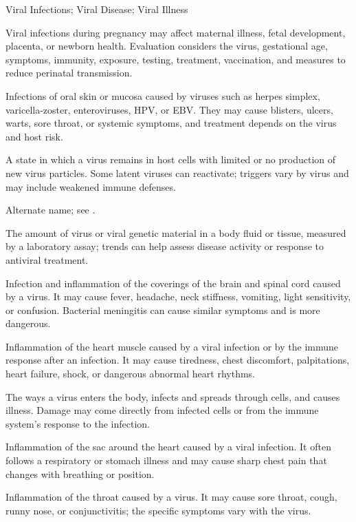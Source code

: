 \synonyms
Viral Infections; Viral Disease; Viral Illness

 Viral infections during pregnancy may affect maternal illness, fetal development, placenta, or newborn health. Evaluation considers the virus, gestational age, symptoms, immunity, exposure, testing, treatment, vaccination, and measures to reduce perinatal transmission.

 Infections of oral skin or mucosa caused by viruses such as herpes simplex, varicella-zoster, enteroviruses, HPV, or EBV. They may cause blisters, ulcers, warts, sore throat, or systemic symptoms, and treatment depends on the virus and host risk.

 A state in which a virus remains in host cells with limited or no production of new virus particles. Some latent viruses can reactivate; triggers vary by virus and may include weakened immune defenses.

 Alternate name; see .

 The amount of virus or viral genetic material in a body fluid or tissue, measured by a laboratory assay; trends can help assess disease activity or response to antiviral treatment.

 Infection and inflammation of the coverings of the brain and spinal cord caused by a virus. It may cause fever, headache, neck stiffness, vomiting, light sensitivity, or confusion. Bacterial meningitis can cause similar symptoms and is more dangerous.

 Inflammation of the heart muscle caused by a viral infection or by the immune response after an infection. It may cause tiredness, chest discomfort, palpitations, heart failure, shock, or dangerous abnormal heart rhythms.


 The ways a virus enters the body, infects and spreads through cells, and causes illness. Damage may come directly from infected cells or from the immune system’s response to the infection.

 Inflammation of the sac around the heart caused by a viral infection. It often follows a respiratory or stomach illness and may cause sharp chest pain that changes with breathing or position.


 Inflammation of the throat caused by a virus. It may cause sore throat, cough, runny nose, or conjunctivitis; the specific symptoms vary with the virus.

